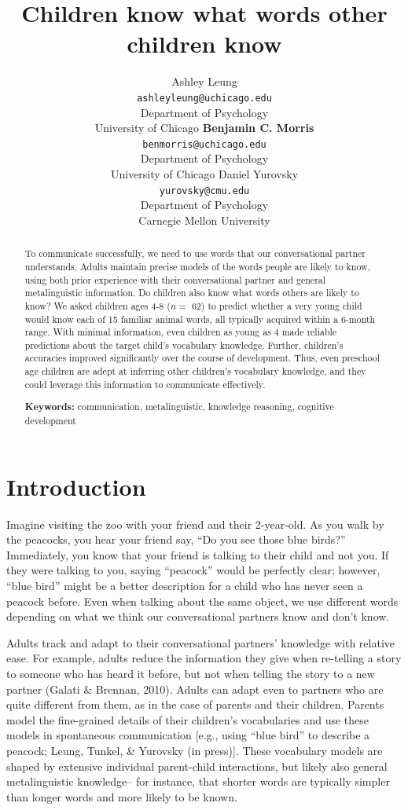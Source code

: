 \documentclass[10pt, letterpaper]{article}
\title{Children know what words other children know}
\author{Ashley Leung \\
     \texttt{ashleyleung@uchicago.edu} \\
    Department of Psychology \\ University of Chicago
\And \textbf{Benjamin C. Morris} \\
     \texttt{benmorris@uchicago.edu} \\
    Department of Psychology \\ University of Chicago
\And Daniel Yurovsky \\
     \texttt{yurovsky@cmu.edu} \\
    Department of Psychology \\ Carnegie Mellon University}
\begin{document}
\maketitle

\begin{abstract}
To communicate successfully, we need to use words that our
conversational partner understands. Adults maintain precise models of
the words people are likely to know, using both prior experience with
their conversational partner and general metalinguistic information. Do
children also know what words others are likely to know? We asked
children ages 4-8 (\(n =\) 62) to predict whether a very young child
would know each of 15 familiar animal words, all typically acquired
within a 6-month range. With minimal information, even children as young
as 4 made reliable predictions about the target child's vocabulary
knowledge. Further, children's accuracies improved significantly over
the course of development. Thus, even preschool age children are adept
at inferring other children's vocabulary knowledge, and they could
leverage this information to communicate effectively.

\textbf{Keywords:}
communication, metalinguistic, knowledge reasoning, cognitive
development
\end{abstract}

\hypertarget{introduction}{%
\section{Introduction}\label{introduction}}

Imagine visiting the zoo with your friend and their 2-year-old. As you
walk by the peacocks, you hear your friend say, ``Do you see those blue
birds?'' Immediately, you know that your friend is talking to their
child and not you. If they were talking to you, saying ``peacock'' would
be perfectly clear; however, ``blue bird'' might be a better description
for a child who has never seen a peacock before. Even when talking about
the same object, we use different words depending on what we think our
conversational partners know and don't know.

Adults track and adapt to their conversational partners' knowledge with
relative ease. For example, adults reduce the information they give when
re-telling a story to someone who has heard it before, but not when
telling the story to a new partner (Galati \& Brennan, 2010). Adults can
adapt even to partners who are quite different from them, as in the case
of parents and their children. Parents model the fine-grained details of
their children's vocabularies and use these models in spontaneous
communication {[}e.g., using ``blue bird'' to describe a peacock; Leung,
Tunkel, \& Yurovsky (in press){]}. These vocabulary models are shaped by
extensive individual parent-child interactions, but likely also general
metalinguistic knowledge-- for instance, that shorter words are
typically simpler than longer words and more likely to be known.
\end{document}
